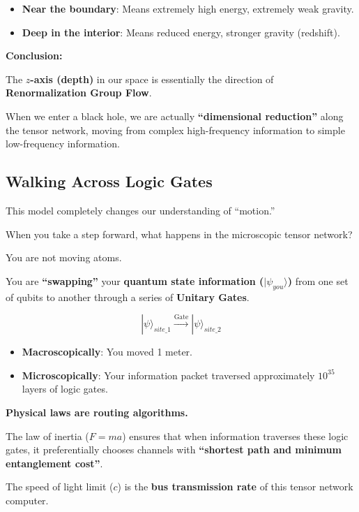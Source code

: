 \begin{itemize}
\item \textbf{Near the boundary}: Means extremely high energy, extremely weak gravity.

\item \textbf{Deep in the interior}: Means reduced energy, stronger gravity (redshift).
\end{itemize}

\textbf{Conclusion:}

The \textbf{$z$-axis (depth)} in our space is essentially the direction of \textbf{Renormalization Group Flow}.

When we enter a black hole, we are actually \textbf{``dimensional reduction''} along the tensor network, moving from complex high-frequency information to simple low-frequency information.

\subsection{Walking Across Logic Gates}

This model completely changes our understanding of ``motion.''

When you take a step forward, what happens in the microscopic tensor network?

You are not moving atoms.

You are \textbf{``swapping''} your \textbf{quantum state information ($|\psi_{you}\rangle$)} from one set of qubits to another through a series of \textbf{Unitary Gates}.

\[|\psi\rangle_{site\_1} \xrightarrow{\text{Gate}} |\psi\rangle_{site\_2}\]

\begin{itemize}
\item \textbf{Macroscopically}: You moved 1 meter.

\item \textbf{Microscopically}: Your information packet traversed approximately $10^{35}$ layers of logic gates.
\end{itemize}

\textbf{Physical laws are routing algorithms.}

The law of inertia ($F=ma$) ensures that when information traverses these logic gates, it preferentially chooses channels with \textbf{``shortest path and minimum entanglement cost''}.

The speed of light limit ($c$) is the \textbf{bus transmission rate} of this tensor network computer.

